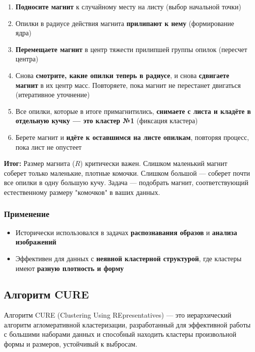 \documentclass[11pt]{article}
\begin{document}
\begin{enumerate}
    \item \textbf{Подносите магнит} к случайному месту на листу (выбор начальной точки)
    \item Опилки в радиусе действия магнита \textbf{прилипают к нему} (формирование ядра)
    \item \textbf{Перемещаете магнит} в центр тяжести прилипшей группы опилок (пересчет центра)
    \item Снова \textbf{смотрите, какие опилки теперь в радиусе}, и снова \textbf{сдвигаете магнит} в их центр масс. Повторяете, пока магнит не перестанет двигаться (итеративное уточнение)
    \item Все опилки, которые в итоге примагнитились, \textbf{снимаете с листа и кладёте в отдельную кучку — это кластер №1} (фиксация кластера)
    \item Берете магнит и \textbf{идёте к оставшимся на листе опилкам}, повторяя процесс, пока лист не опустеет
\end{enumerate}

\textbf{Итог:} Размер магнита ($R$) критически важен. Слишком маленький магнит соберет только маленькие, плотные комочки. Слишком большой — соберет почти все опилки в одну большую кучу. Задача — подобрать магнит, соответствующий естественному размеру "комочков" в ваших данных.

\subsubsection{Применение}
\begin{itemize}
    \item Исторически использовался в задачах \textbf{распознавания образов} и \textbf{анализа изображений}
    \item Эффективен для данных с \textbf{неявной кластерной структурой}, где кластеры имеют \textbf{разную плотность и форму}
\end{itemize}

\subsection{Алгоритм CURE}

Алгоритм CURE (Clustering Using REpresentatives) — это иерархический алгоритм агломеративной кластеризации, разработанный для эффективной работы с большими наборами данных и способный находить кластеры произвольной формы и размеров, устойчивый к выбросам.
\end{document}

